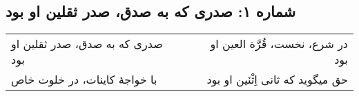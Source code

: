\begin{center}
\section*{شماره ۱: صدری که به صدق، صدر ثقلین او بود}
\label{sec:001}
\begin{longtable}{l p{0.5cm} r}
صدری که به صدق، صدر ثقلین او بود
&&
در شرع، نخست، قُرَّة العین او بود
\\
با خواجهٔ کاینات، در خلوت خاص
&&
حق میگوید که ثانی اِثْنَین او بود
\\
\end{longtable}
\end{center}
